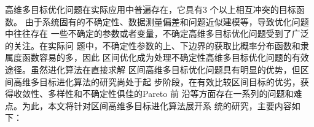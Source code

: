 \begin{cabstract}

高维多目标优化问题在实际应用中普遍存在，它具有3 个以上相互冲突的目标函数。
由于系统固有的不确定性、数据测量偏差和问题近似建模等，导致优化问题中往往存在
一些不确定的参数或者变量，不确定高维多目标优化问题受到了广泛的关注。在实际问
题中，不确定性参数的上、下边界的获取比概率分布函数和隶属度函数容易的多，因此
区间优化成为处理不确定性高维多目标优化问题的有效途径。虽然进化算法在直接求解
区间高维多目标优化问题具有明显的优势，但区间高维多目标进化算法的研究尚处于起
步阶段，在有效比较区间目标的优劣，获得收敛性、多样性和不确定性俱佳的Pareto 前
沿等方面存在一系列的问题和难点。为此，本文将针对区间高维多目标进化算法展开系
统的研究，主要内容如下：
\zhlipsum[1-5]

\end{cabstract}

\begin{eabstract} 
%
\lipsum[1-5]
\end{eabstract}

